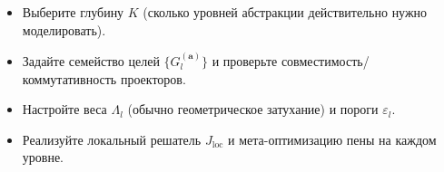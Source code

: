 \documentclass[11pt]{article}
\begin{document}
\begin{itemize}[leftmargin=*, itemsep=2pt]
  \item Выберите глубину $K$ (сколько уровней абстракции действительно нужно моделировать).
  \item Задайте семейство целей $\{G_l^{(\mathbf{a})}\}$ и проверьте совместимость/коммутативность проекторов.
  \item Настройте веса $\Lambda_l$ (обычно геометрическое затухание) и пороги $\varepsilon_l$.
  \item Реализуйте локальный решатель $J_{\text{loc}}$ и мета-оптимизацию пены на каждом уровне.
\end{itemize}
\end{document}
